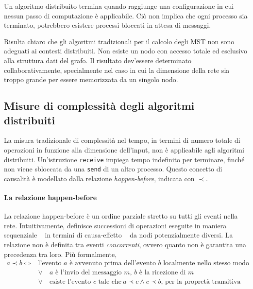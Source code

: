 \documentclass[target=bach,aauheader=,style=]{thud}
\newcommand{\eng}[1]{\foreignlanguage{english}{#1}}
\begin{document}
Un algoritmo distribuito termina quando raggiunge una configurazione in cui nessun passo di computazione è applicabile. Ciò non implica che ogni processo sia terminato, potrebbero esistere processi bloccati in attesa di messaggi.

Risulta chiaro che gli algoritmi tradizionali per il calcolo degli MST non sono adeguati ai contesti distribuiti. Non esiste un nodo con accesso totale ed esclusivo alla struttura dati del grafo. Il risultato dev'essere determinato collaborativamente, specialmente nel caso in cui la dimensione della rete sia troppo grande per essere memorizzata da un singolo nodo.

\subsection{Misure di complessità degli algoritmi distribuiti}
La misura tradizionale di complessità nel tempo, in termini di numero totale di operazioni in funzione alla dimensione dell'\eng{input}, non è applicabile agli algoritmi distribuiti. Un'istruzione \lstinline{receive} impiega tempo indefinito per terminare, finché non viene sbloccata da una \lstinline{send} di un altro processo. Questo concetto di causalità è modellato dalla relazione \eng{\emph{happen-before}}, indicata con $\prec$.

\paragraph{La relazione \eng{happen-before}}\label{algs:happenbefore}
La relazione \eng{happen-before} è un ordine parziale stretto su tutti gli eventi nella rete. Intuitivamente, definisce successioni di operazioni eseguite in maniera sequenziale \,\textendash\,~in termini di causa-effetto~\,\textendash\, da nodi potenzialmente diversi. La relazione non è definita tra eventi \emph{concorrenti}, ovvero quanto non è garantita una precedenza tra loro. Più formalmente,
\begin{equation}
\begin{split}
a\prec b\iff &\text{l'evento $a$ è avvenuto prima dell'evento $b$ localmente nello stesso modo}\\
&\lor\quad\text{$a$ è l'invio del messaggio $m$, $b$ è la ricezione di $m$}\\
&\lor\quad\text{esiste l'evento $c$ tale che}\ a\prec c\land c\prec b\text{, per la propretà transitiva}
\end{split}
\end{equation}
\end{document}
